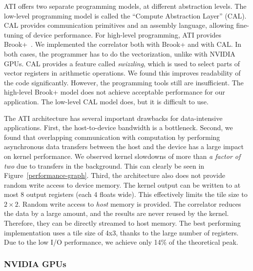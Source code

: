 \documentclass{article}
\begin{document}
ATI offers two separate programming models, at different abstraction
levels.  The low-level programming model is called the ``Compute
Abstraction Layer'' (CAL).  CAL provides communication primitives and
an assembly language, allowing fine-tuning of device
performance. For high-level programming, ATI provides Brook+~\cite{amd-manual}.  We
implemented the correlator both with Brook+ and with CAL.
In both cases, the programmer has to do the vectorization,
unlike with NVIDIA GPUs.  CAL provides a feature called
\emph{swizzling}, which is used to select parts of vector registers in
arithmetic operations.  We found this improves readability of the code
significantly. However, the
programming tools still are insufficient. The high-level Brook+ model does
not achieve acceptable performance for our application. The low-level
CAL model does, but it is difficult to use.

The ATI architecture has several important
drawbacks for data-intensive applications.  First, the
host-to-device bandwidth is a bottleneck.  Second, we found that
overlapping communication with computation by performing asynchronous
data transfers between the host and the device has a large impact on
kernel performance. We observed kernel slowdowns of more than \emph{a factor of
two} due to transfers in the background. This can clearly be seen in Figure~\ref{performance-graph}.
Third, the architecture also does not provide random write access to device
memory. The kernel output can be written to at most 8 output registers
(each 4 floats wide).  This effectively limits the
tile size to $2\times2$.  Random write access to \emph{host} memory is
provided.  The correlator reduces the data by a large amount, and the
results are never reused by the kernel. Therefore, they can be
directly streamed to host memory.
The best performing implementation uses a tile size of 4x3, thanks to
the large number of registers.  
Due to the low I/O performance, we achieve only 14\% of the theoretical peak.


\subsubsection{NVIDIA GPUs}
\end{document}
